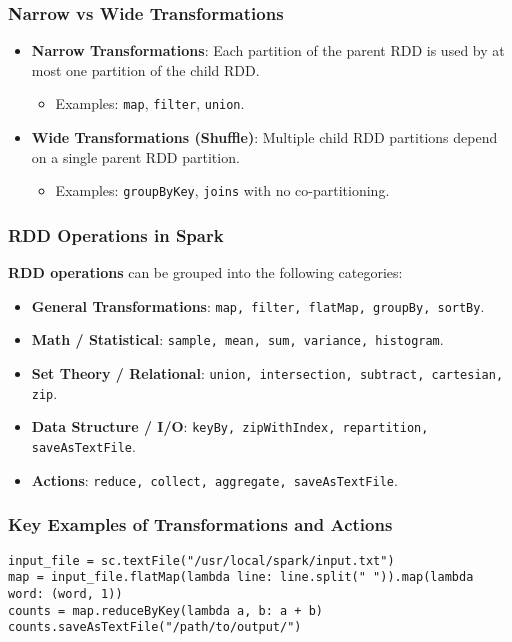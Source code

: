 \documentclass[12pt]{article}
\begin{document}
\subsubsection{Narrow vs Wide Transformations}
\begin{itemize}
    \item \textbf{Narrow Transformations}: Each partition of the parent RDD is used by at most one partition of the child RDD.
    \begin{itemize}
        \item Examples: \texttt{map}, \texttt{filter}, \texttt{union}.
    \end{itemize}
    \item \textbf{Wide Transformations (Shuffle)}: Multiple child RDD partitions depend on a single parent RDD partition.
    \begin{itemize}
        \item Examples: \texttt{groupByKey}, \texttt{joins} with no co-partitioning.
    \end{itemize}
\end{itemize}

\subsubsection{RDD Operations in Spark}
\textbf{RDD operations} can be grouped into the following categories:
\begin{itemize}
    \item \textbf{General Transformations}:
    \texttt{map, filter, flatMap, groupBy, sortBy}.
    \item \textbf{Math / Statistical}:
    \texttt{sample, mean, sum, variance, histogram}.
    \item \textbf{Set Theory / Relational}:
    \texttt{union, intersection, subtract, cartesian, zip}.
    \item \textbf{Data Structure / I/O}:
    \texttt{keyBy, zipWithIndex, repartition, saveAsTextFile}.
    \item \textbf{Actions}:
    \texttt{reduce, collect, aggregate, saveAsTextFile}.
\end{itemize}

\subsubsection{Key Examples of Transformations and Actions}
\begin{verbatim}
input_file = sc.textFile("/usr/local/spark/input.txt")
map = input_file.flatMap(lambda line: line.split(" ")).map(lambda word: (word, 1))
counts = map.reduceByKey(lambda a, b: a + b)
counts.saveAsTextFile("/path/to/output/")
\end{verbatim}
\end{document}
